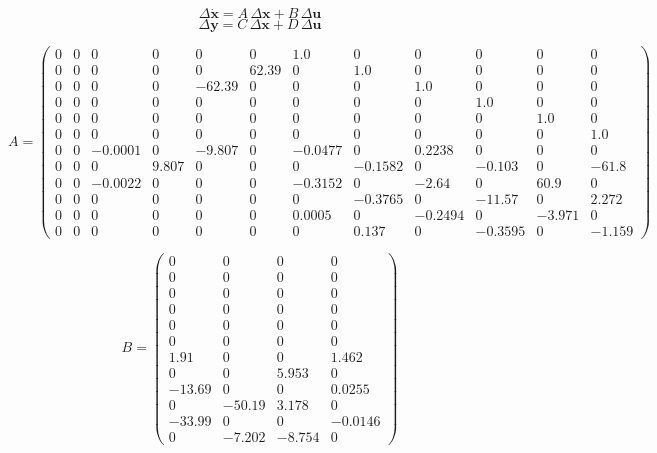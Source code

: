 \documentclass[lettersize,journal]{IEEEtran}
\begin{document}
{\newpage

\begin{equation}
\Delta \bm{\dot{x}} = A\,\Delta\bm{x} + B\,\Delta\bm{u}
\end{equation}
\begin{equation}
\Delta\bm{y} = C\,\Delta\bm{x} + D\,\Delta\bm{u}
\end{equation}

\vfill\null
\begin{equation}
A = \left(\begin{array}{cccccccccccc} 0 & 0 & 0 & 0 & 0 & 0 & 1.0 & 0 & 0 & 0 & 0 & 0\\ 0 & 0 & 0 & 0 & 0 & 62.39 & 0 & 1.0 & 0 & 0 & 0 & 0\\ 0 & 0 & 0 & 0 & -62.39 & 0 & 0 & 0 & 1.0 & 0 & 0 & 0\\ 0 & 0 & 0 & 0 & 0 & 0 & 0 & 0 & 0 & 1.0 & 0 & 0\\ 0 & 0 & 0 & 0 & 0 & 0 & 0 & 0 & 0 & 0 & 1.0 & 0\\ 0 & 0 & 0 & 0 & 0 & 0 & 0 & 0 & 0 & 0 & 0 & 1.0\\ 0 & 0 & -0.0001 & 0 & -9.807 & 0 & -0.0477 & 0 & 0.2238 & 0 & 0 & 0\\ 0 & 0 & 0 & 9.807 & 0 & 0 & 0 & -0.1582 & 0 & -0.103 & 0 & -61.8\\ 0 & 0 & -0.0022 & 0 & 0 & 0 & -0.3152 & 0 & -2.64 & 0 & 60.9 & 0\\ 0 & 0 & 0 & 0 & 0 & 0 & 0 & -0.3765 & 0 & -11.57 & 0 & 2.272\\ 0 & 0 & 0 & 0 & 0 & 0 & 0.0005 & 0 & -0.2494 & 0 & -3.971 & 0\\ 0 & 0 & 0 & 0 & 0 & 0 & 0 & 0.137 & 0 & -0.3595 & 0 & -1.159 \end{array}\right)
\end{equation}

\vfill\null
\begin{equation}
B = \left(\begin{array}{cccc} 0 & 0 & 0 & 0\\ 0 & 0 & 0 & 0\\ 0 & 0 & 0 & 0\\ 0 & 0 & 0 & 0\\ 0 & 0 & 0 & 0\\ 0 & 0 & 0 & 0\\ 1.91 & 0 & 0 & 1.462\\ 0 & 0 & 5.953 & 0\\ -13.69 & 0 & 0 & 0.0255\\ 0 & -50.19 & 3.178 & 0\\ -33.99 & 0 & 0 & -0.0146\\ 0 & -7.202 & -8.754 & 0 \end{array}\right)
\end{equation}

}
\end{document}
